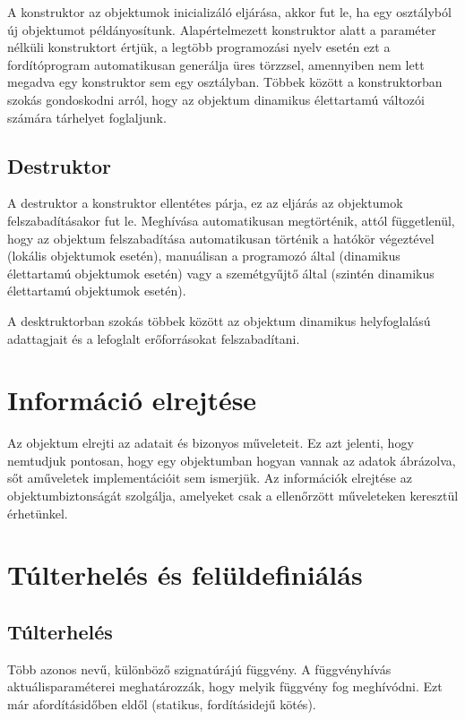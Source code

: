\documentclass[margin=0px]{article}
\begin{document}
A konstruktor az objektumok inicializáló eljárása, akkor fut le, ha egy osztályból új objektumot példányosítunk. Alapértelmezett konstruktor alatt a paraméter nélküli konstruktort értjük, a legtöbb programozási nyelv esetén ezt a fordítóprogram automatikusan generálja üres törzzsel, amennyiben nem lett megadva egy konstruktor sem egy osztályban.
Többek között a konstruktorban szokás gondoskodni arról, hogy az objektum dinamikus élettartamú változói számára tárhelyet foglaljunk.

\subsection{Destruktor}

A destruktor a konstruktor ellentétes párja, ez az eljárás az objektumok felszabadításakor fut le. Meghívása automatikusan megtörténik, attól függetlenül, hogy az objektum felszabadítása automatikusan történik a hatókör végeztével (lokális objektumok esetén), manuálisan a programozó	által (dinamikus élettartamú objektumok esetén) vagy a szemétgyűjtő által (szintén dinamikus élettartamú objektumok esetén).

A desktruktorban szokás többek között az objektum dinamikus helyfoglalású adattagjait és a lefoglalt erőforrásokat felszabadítani.

\section{Információ elrejtése}
Az objektum elrejti az adatait és bizonyos műveleteit. Ez azt jelenti, hogy nemtudjuk pontosan, hogy egy objektumban hogyan vannak az adatok ábrázolva, sőt aműveletek implementációit sem ismerjük. Az információk elrejtése az objektumbiztonságát szolgálja, amelyeket csak a ellenőrzött műveleteken keresztül érhetünkel.

\section{Túlterhelés és felüldefiniálás}

\subsection{Túlterhelés}

Több azonos nevű, különböző szignatúrájú függvény. A függvényhívás aktuálisparaméterei meghatározzák, hogy melyik függvény fog meghívódni. Ezt már afordításidőben eldől (statikus, fordításidejű kötés).
\end{document}
